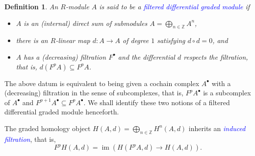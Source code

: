 \documentclass[11pt]{article}
\theoremstyle{thmstyle}
\theoremstyle{defstyle}
\newtheorem{definition}[theorem]{Definition}
\newcommand{\Z}{\mathbb{Z}}
\newcommand{\im}{\operatorname{im}}
\newcommand{\define}[1]{\textcolor{blue}{\textit{#1}}}
\begin{document}
\begin{definition}
    An $R$-module $A$ is said to be a \define{filtered differential graded module} if 
    \begin{itemize}
        \item $A$ is an (internal) direct sum of submodules $\displaystyle A = \bigoplus_{n\in\Z} A^n$, 
        \item there is an $R$-linear map $d\colon A\to A$ of degree $1$ satisfying $d\circ d = 0$, and 
        \item $A$ has a (decreasing) filtration $F^\bullet$ and the differential $d$ respects the filtration, that is, $d(F^p A)\subseteq F^p A$.
    \end{itemize}
\end{definition}
The above datum is equivalent to being given a cochain complex $A^\bullet$ with a (decreasing) filtration in the sense of subcomplexes, that is, $F^pA^\bullet$ is a subcomplex of $A^\bullet$ and $F^{p + 1}A^\bullet\subseteq F^pA^\bullet$. We shall identify these two notions of a filtered differential graded module henceforth.

The graded homology object $\displaystyle H(A, d) = \bigoplus_{n\in\Z} H^n(A, d)$ inherits an \define{induced filtration}, that is, 
\begin{equation*}
    F^p H(A, d) = \im\left(H(F^p A, d)\to H(A, d)\right).
\end{equation*}
\end{document}
